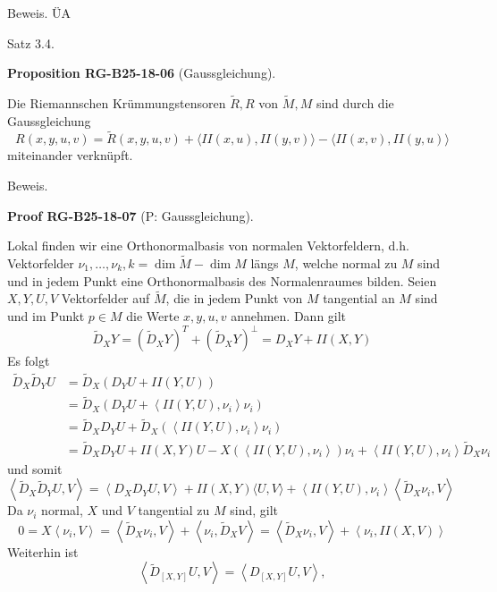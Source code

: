 \documentclass[10pt, letterpaper]{article}
\newcommand{\CustomHeading}[3]{%
  \par\medskip\noindent%
  \textbf{#1 #2} \textnormal{(#3)}.\enskip%
}
\newenvironment{PROP}[2]{\begin{unitbox}\CustomHeading{Proposition}{#1}{#2}}{\end{unitbox}}
\newenvironment{PROOF}[2]{\begin{unitbox}\CustomHeading{Proof}{#1}{#2}}{\end{unitbox}}
\begin{document}
Beweis. ÜA



Satz 3.4. 

\begin{PROP}{RG-B25-18-06}{Gaussgleichung}
Die Riemannschen Krümmungstensoren $\tilde{R}, R$ von $\tilde{M}, M$ sind durch die Gaussgleichung
$$
R(x, y, u, v)=\tilde{R}(x, y, u, v)+\langle I I(x, u), I I(y, v)\rangle-\langle I I(x, v), I I(y, u)\rangle
$$
miteinander verknüpft.
\end{PROP}


Beweis. 

\begin{PROOF}{RG-B25-18-07}{P: Gaussgleichung}
Lokal finden wir eine Orthonormalbasis von normalen Vektorfeldern, d.h. Vektorfelder $\nu_{1}, \ldots, \nu_{k}, k=\operatorname{dim} \tilde{M}-\operatorname{dim} M$ längs $M$, welche normal zu $M$ sind und in jedem Punkt eine Orthonormalbasis des Normalenraumes bilden. Seien $X, Y, U, V$ Vektorfelder auf $\tilde{M}$, die in jedem Punkt von $M$ tangential an $M$ sind und im Punkt $p \in M$ die Werte $x, y, u, v$ annehmen. Dann gilt
$$
\tilde{D}_{X} Y=\left(\tilde{D}_{X} Y\right)^{T}+\left(\tilde{D}_{X} Y\right)^{\perp}=D_{X} Y+I I(X, Y)
$$
Es folgt
$$
\begin{aligned}
\tilde{D}_{X} \tilde{D}_{Y} U & =\tilde{D}_{X}\left(D_{Y} U+I I(Y, U)\right) \\
& =\tilde{D}_{X}\left(D_{Y} U+\left\langle I I(Y, U), \nu_{i}\right\rangle \nu_{i}\right) \\
& =\tilde{D}_{X} D_{Y} U+\tilde{D}_{X}\left(\left\langle I I(Y, U), \nu_{i}\right\rangle \nu_{i}\right) \\
& =\tilde{D}_{X} D_{Y} U+I I(X, Y) U-X\left(\left\langle I I(Y, U), \nu_{i}\right\rangle\right) \nu_{i}+\left\langle I I(Y, U), \nu_{i}\right\rangle \tilde{D}_{X} \nu_{i}
\end{aligned}
$$
und somit
$\left\langle\tilde{D}_{X} \tilde{D}_{Y} U, V\right\rangle=\left\langle D_{X} D_{Y} U, V\right\rangle+I I(X, Y)\langle U, V\rangle+\left\langle I I(Y, U), \nu_{i}\right\rangle\left\langle\tilde{D}_{X} \nu_{i}, V\right\rangle$\\
Da $\nu_{i}$ normal, $X$ und $V$ tangential zu $M$ sind, gilt
$$
0=X\left\langle\nu_{i}, V\right\rangle=\left\langle\tilde{D}_{X} \nu_{i}, V\right\rangle+\left\langle\nu_{i}, \tilde{D}_{X} V\right\rangle=\left\langle\tilde{D}_{X} \nu_{i}, V\right\rangle+\left\langle\nu_{i}, I I(X, V)\right\rangle
$$
Weiterhin ist
$$
\left\langle\tilde{D}_{[X, Y]} U, V\right\rangle=\left\langle D_{[X, Y]} U, V\right\rangle,
$$
\end{PROOF}
\end{document}
